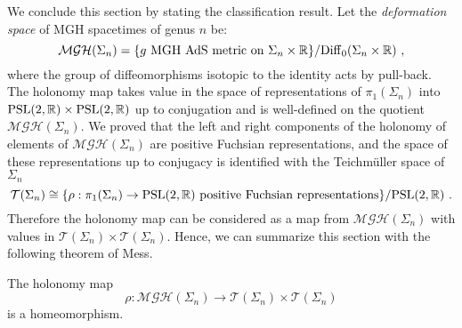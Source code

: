 We conclude this section by stating the classification result. Let the \emph{deformation space} of MGH spacetimes of genus $n$ be:
$$\mathcal{MGH}(\Sigma_n)=\{g\text{ MGH AdS metric on }\Sigma_n\times\mathbb{R}\}/\mathrm{Diff}_0(\Sigma_n\times\mathbb{R})~,$$
where the group of diffeomorphisms isotopic to the identity acts by pull-back. The holonomy map takes value in the space of representations of $\pi_1(\Sigma_n)$ into $\text{PSL}(2,\mathbb{R})\times\text{PSL}(2,\mathbb{R})$ up to conjugation and is well-defined on the quotient $\mathcal{MGH}(\Sigma_n)$.
We proved that the left and right components of the holonomy of elements of $\mathcal{MGH}(\Sigma_n)$ are positive Fuchsian representations, and the space of these representations up to conjugacy is identified with the Teichm\"uller space of $\Sigma_n$
\[
    \mathcal{T}(\Sigma_n)\cong\{\rho:\pi_1(\Sigma_n)\to\text{PSL}(2,\mathbb{R})\text{ positive Fuchsian representations}\}/\text{PSL}(2,\mathbb{R})~.
\]
Therefore the holonomy map can be considered as a map 
from $\mathcal{MGH}(\Sigma_n)$ with values in $\mathcal{T}(\Sigma_n)\times\mathcal{T}(\Sigma_n)$.
Hence, we can summarize this section with the following theorem of Mess.

\begin{theorem} \label{thm:classification rgeq2}
The holonomy map $$\rho:\mathcal{MGH}(\Sigma_n)\to\mathcal{T}(\Sigma_n)\times\mathcal{T}(\Sigma_n)$$ is a homeomorphism.
\end{theorem}
